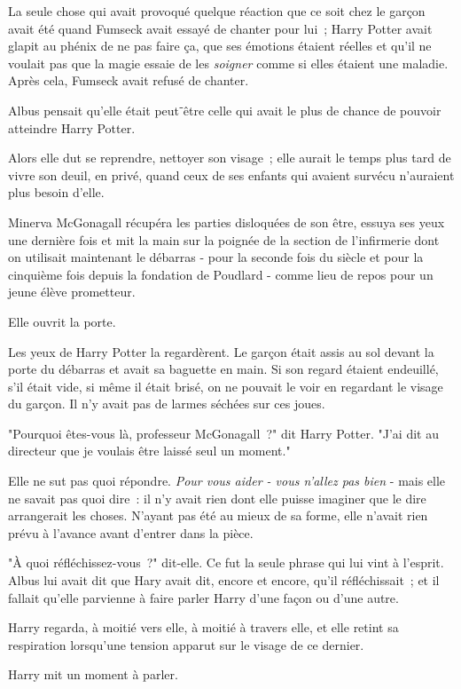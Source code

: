 La seule chose qui avait provoqué quelque réaction que ce soit chez le garçon avait été quand Fumseck avait essayé de chanter pour lui~; Harry Potter avait glapit au phénix de ne pas faire ça, que ses émotions étaient réelles et qu'il ne voulait pas que la magie essaie de les \emph{soigner} comme si elles étaient une maladie. Après cela, Fumseck avait refusé de chanter.

Albus pensait qu'elle était peut⁻être celle qui avait le plus de chance de pouvoir atteindre Harry Potter.

Alors elle dut se reprendre, nettoyer son visage~; elle aurait le temps plus tard de vivre son deuil, en privé, quand ceux de ses enfants qui avaient survécu n'auraient plus besoin d'elle.

Minerva McGonagall récupéra les parties disloquées de son être, essuya ses yeux une dernière fois et mit la main sur la poignée de la section de l'infirmerie dont on utilisait maintenant le débarras - pour la seconde fois du siècle et pour la cinquième fois depuis la fondation de Poudlard - comme lieu de repos pour un jeune élève prometteur.

Elle ouvrit la porte.

Les yeux de Harry Potter la regardèrent. Le garçon était assis au sol devant la porte du débarras et avait sa baguette en main. Si son regard étaient endeuillé, s'il était vide, si même il était brisé, on ne pouvait le voir en regardant le visage du garçon. Il n'y avait pas de larmes séchées sur ces joues.

"Pourquoi êtes-vous là, professeur McGonagall~?" dit Harry Potter. "J'ai dit au directeur que je voulais être laissé seul un moment."

Elle ne sut pas quoi répondre. \emph{Pour vous aider - vous n'allez pas bien} - mais elle ne savait pas quoi dire~: il n'y avait rien dont elle puisse imaginer que le dire arrangerait les choses. N'ayant pas été au mieux de sa forme, elle n'avait rien prévu à l'avance avant d'entrer dans la pièce.

"À quoi réfléchissez-vous~?" dit-elle. Ce fut la seule phrase qui lui vint à l'esprit. Albus lui avait dit que Hary avait dit, encore et encore, qu'il réfléchissait~; et il fallait qu'elle parvienne à faire parler Harry d'une façon ou d'une autre.

Harry regarda, à moitié vers elle, à moitié à travers elle, et elle retint sa respiration lorsqu'une tension apparut sur le visage de ce dernier.

Harry mit un moment à parler.

